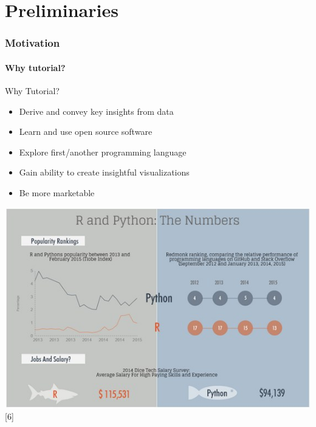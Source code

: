 \part{Preliminaries}

\section{Motivation}
\subsection{Why tutorial?} 
\normalfont
\begin{frame}
	\begin{center}
  		\begin{alertblock}{Why Tutorial?} 
  			\begin{itemize}
  				\item Derive and convey key insights from data
  				\item Learn and use open source software
  				\item Explore first/another programming language
  				\item Gain ability to create insightful visualizations
  				\item Be more marketable 
  			\end{itemize}
		\end{alertblock}

	       \begin{center}
	         \includegraphics[scale=0.25]{images/r-vs-python-numbers}[6]
	        \end{center}

	\end{center} 
\end{frame}


